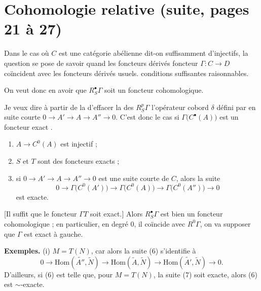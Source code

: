 \documentclass[11pt,a4paper]{article}
\begin{document}
\section*{Cohomologie relative (suite, pages 21 à 27)}


Dans le cas où $C$ est une catégorie abélienne  dit-on
suffisamment d'injectifs, la question se pose de savoir quand les foncteurs
dérivés    foncteur $\Gamma : C \to D$
coïncident avec les foncteurs dérivés usuels. 
 conditions suffisantes raisonnables.

On veut donc en avoir que $R_S^{\bullet}\Gamma$ soit un foncteur
cohomologique.  \ill{}

Je veux dire \ill{} à partir de la \ill{} d'effacer la \ill{} des
$R_S^{p}\Gamma$ \ill{} l'opérateur cobord $\delta$ défini par \ill{} en suite
courte $0 \to A' \to A \to A'' \to 0$. C'est donc le cas si
$\Gamma\bigl( C^{\bullet}(A) \bigr)$ est un foncteur exact \ill{}.

\begin{enumerate}
\item[(i)] $A \to C^{0}(A)$ est injectif ;
\item[(ii)] $S$ et $T$  sont des
  foncteurs exacts ;
\item[(iii)] si $0 \to A' \to A \to A'' \to 0$ est une suite courte de $C$,
  alors la suite
  \[
    0 \longrightarrow \Gamma\bigl( C^{0}(A') \bigr) \longrightarrow
    \Gamma\bigl( C^{0}(A) \bigr) \longrightarrow
    \Gamma\bigl( C^{0}(A'') \bigr) \longrightarrow 0
  \]
  est exacte.
\end{enumerate}

[Il suffit que le foncteur $\Gamma T$ soit exact.] Alors
$R_S^{\bullet}\Gamma$ est bien un foncteur cohomologique ; en particulier, en
degré $0$, il coïncide avec $R^{0}\Gamma$, \ill{} on va supposer que
 $\Gamma$ est exact à gauche.

\textbf{Exemples.} (i) \ill{} $M = T(N)$, car alors la suite (6) s'identifie à
\[
  0 \longrightarrow \mathrm{Hom}(\widetilde{A''}, \widetilde{N})
    \longrightarrow \mathrm{Hom}(\widetilde{A}, \widetilde{N})
    \longrightarrow \mathrm{Hom}(\widetilde{A'}, \widetilde{N})
    \longrightarrow 0 .
\]
D'ailleurs, si (6) est telle que, pour  $M = T(N)$, la suite (7)
soit exacte, alors (6) est $\sim$-exacte.
\end{document}
